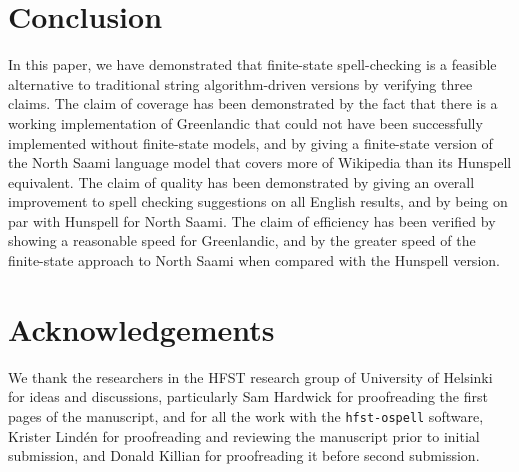 \documentclass[a4paper,12pt]{article}
\begin{document}
\section{Conclusion}
\label{sec:conclusion}

In this paper, we have demonstrated that finite-state spell-checking is a
feasible alternative to traditional string algorithm-driven versions by
verifying three claims. The claim of coverage has been demonstrated by the fact
that there is a working implementation of Greenlandic that could not have been
successfully implemented without finite-state models, and by giving a
finite-state version of the North Saami language model that covers more of
Wikipedia than its Hunspell equivalent. The claim of quality has been
demonstrated by giving an overall improvement to spell checking suggestions on all
English results, and by being on par with Hunspell for North Saami. The claim
of efficiency has been verified by showing a reasonable speed for Greenlandic, and
by the greater speed of the finite-state approach to North Saami when compared with
the Hunspell version.

\section*{Acknowledgements}

We thank the researchers in the HFST research group of University of Helsinki
for ideas and discussions, particularly Sam Hardwick for proofreading
the first pages of the manuscript, and for all the work with the
\texttt{hfst-ospell} software, Krister Lindén for proofreading and
reviewing the manuscript prior to initial submission, and Donald Killian for
proofreading it before second submission.


\end{document}
